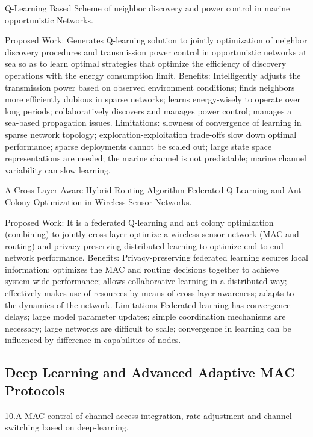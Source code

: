 \documentclass[a4paper,fleqn]{cas-dc}
\numberwithin{equation}{section}
\begin{document}
Q-Learning Based Scheme of neighbor discovery and power control in marine opportunistic Networks.

Proposed Work: Generates Q-learning solution to jointly optimization of neighbor discovery procedures and transmission power control in opportunistic networks at sea so as to learn optimal strategies that optimize the efficiency of discovery operations with the energy consumption limit. Benefits: Intelligently adjusts the transmission power based on observed environment conditions; finds neighbors more efficiently dubious in sparse networks; learns energy-wisely to operate over long periods; collaboratively discovers and manages power control; manages a sea-based propagation issues. Limitations: slowness of convergence of learning in sparse network topology; exploration-exploitation trade-offs slow down optimal performance; sparse deployments cannot be scaled out; large state space representations are needed; the marine channel is not predictable; marine channel variability can slow learning.\cite{Haripriya2025673}\cite{Arslan2023}



A Cross Layer Aware Hybrid Routing Algorithm Federated Q-Learning and Ant Colony Optimization in Wireless Sensor Networks.

Proposed Work: It is a federated Q-learning and ant colony optimization (combining) to jointly cross-layer optimize a wireless sensor network (MAC and routing) and privacy preserving distributed learning to optimize end-to-end network performance. Benefits: Privacy-preserving federated learning secures local information; optimizes the MAC and routing decisions together to achieve system-wide performance; allows collaborative learning in a distributed way; effectively makes use of resources by means of cross-layer awareness; adapts to the dynamics of the network. Limitations Federated learning has convergence delays; large model parameter updates; simple coordination mechanisms are necessary; large networks are difficult to scale; convergence in learning can be influenced by difference in capabilities of nodes.\cite{Zhang2025}

\subsection{Deep Learning and Advanced Adaptive MAC Protocols}
10.A MAC control of channel access integration, rate adjustment and channel switching based on deep-learning.
\end{document}
